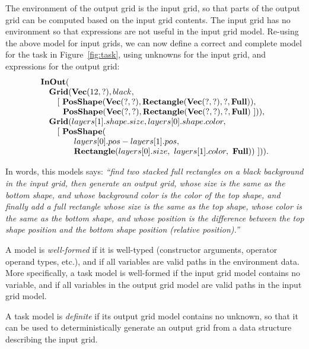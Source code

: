 \documentclass[a4paper]{llncs}
\begin{document}
The environment of the output grid is the input grid, so that parts of
the output grid can be computed based on the input grid contents. The
input grid has no environment so that expressions are not useful in
the input grid model.
%
Re-using the above model for input grids, we can now define a correct
and complete model for the task in Figure~\ref{fig:task}, using
unknowns for the input grid, and expressions for the output grid:
\[\begin{array}{l}
    {\bf InOut}( \\
    \quad {\bf Grid}({\bf Vec}(12,?), black,\\
    \quad \quad [~{\bf PosShape}({\bf Vec}(?,?), {\bf Rectangle}({\bf Vec}(?, ?), ?, {\bf Full})),\\
    \quad \quad ~~{\bf PosShape}({\bf Vec}(?,?), {\bf Rectangle}({\bf Vec}(?, ?), ?, {\bf Full})~])), \\
    \quad {\bf Grid}(layers[1].shape.size, layers[0].shape.color, \\
    \quad \quad [~ {\bf PosShape}(\\
    \quad \quad \quad \quad layers[0].pos - layers[1].pos, \\
    \quad \quad \quad \quad {\bf Rectangle}(layers[0].size,\ layers[1].color,\ {\bf Full})) ~])).
  \end{array} \]

In words, this models says: {\em ``find two stacked full rectangles on a
black background in the input grid, then generate an output grid,
whose size is the same as the bottom shape, and whose background color
is the color of the top shape, and finally add a full rectangle whose
size is the same as the top shape, whose color is the same as the
bottom shape, and whose position is the difference between the top
shape position and the bottom shape position (relative position).''}

A model is {\em well-formed} if it is well-typed (constructor
arguments, operator operand types, etc.), and if all variables are
valid paths in the environment data. More specifically, a task model
is well-formed if the input grid model contains no variable, and if
all variables in the output grid model are valid paths in the input
grid model.

A task model is {\em definite} if its output grid model contains no
unknown, so that it can be used to deterministically generate an
output grid from a data structure describing the input grid.
\end{document}
